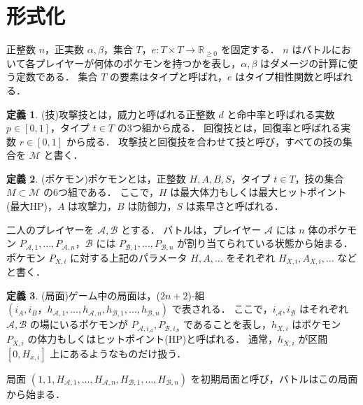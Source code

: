 \documentclass{jsarticle}
\theoremstyle{definition}
\newtheorem{definition}{定義}
\begin{document}
\section{形式化}
正整数 $n$，正実数 $\alpha,\beta$，集合 $T$，$e\colon T \times T \to \mathbb{R}_{\ge 0}$ を固定する．
$n$ はバトルにおいて各プレイヤーが何体のポケモンを持つかを表し，$\alpha,\beta$ はダメージの計算に使う定数である．
集合 $T$ の要素はタイプと呼ばれ，$e$ はタイプ相性関数と呼ばれる．
\begin{definition}
(技)攻撃技とは，威力と呼ばれる正整数 $d$ と命中率と呼ばれる実数 $p\in [0,1]$，タイプ $t\in T$ の3つ組から成る．
回復技とは，回復率と呼ばれる実数 $r \in [0,1]$ から成る．
攻撃技と回復技を合わせて技と呼び，すべての技の集合を $\mathcal M$ と書く．
\end{definition}
\begin{definition}
(ポケモン)ポケモンとは，正整数 $H,A,B,S$，タイプ $t \in T$，技の集合 $M\subset \mathcal M$ の6つ組である．
ここで，$H$ は最大体力もしくは最大ヒットポイント(最大HP)，$A$ は攻撃力，$B$ は防御力，$S$ は素早さと呼ばれる．
\end{definition}
二人のプレイヤーを $\mathcal A,\mathcal B$ とする．
バトルは，プレイヤー $\mathcal A$ には $n$ 体のポケモン $P_{\mathcal A,1},\dots,P_{\mathcal A,n}$，$\mathcal B$ には $P_{\mathcal B,1},\dots,P_{\mathcal B,n}$ が割り当てられている状態から始まる．
ポケモン $P_{X,i}$ に対する上記のパラメータ $H,A,\dots$ をそれぞれ $H_{X,i},A_{X,i},\dots$ などと書く．
\begin{definition}
(局面)ゲーム中の局面は，($2n+2$)-組 $(i_A,i_B，h_{\mathcal A,1},\dots,h_{\mathcal A,n},h_{\mathcal B,1},\dots,h_{\mathcal B,n})$ で表される．
ここで，$i_\mathcal A,i_\mathcal B$ はそれぞれ $\mathcal A,\mathcal B$ の場にいるポケモンが $P_{\mathcal A,i_\mathcal A},P_{\mathcal B,i_\mathcal B}$ であることを表し，$h_{X,i}$ はポケモン $P_{X,i}$ の体力もしくはヒットポイント(HP)と呼ばれる．
通常，$h_{X,i}$ が区間 $[0,H_{x,i}]$ 上にあるようなものだけ扱う．

局面 $(1,1,H_{\mathcal A,1},\dots,H_{\mathcal A,n},H_{\mathcal B,1},\dots,H_{\mathcal B,n})$ を初期局面と呼び，バトルはこの局面から始まる．
\end{definition}
\end{document}
